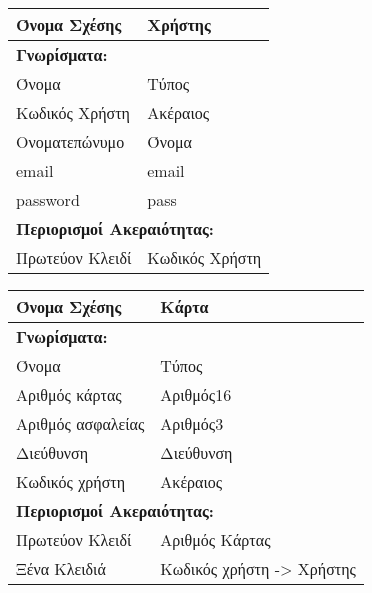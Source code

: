 \begin{tabular}{|p{6cm}|p{8cm}|}
  \hline
  Όνομα Σχέσης    & Χρήστης                                \\ \hline
  \multicolumn{2}{|l|}{\textbf{Γνωρίσματα:}}               \\ \hline
  Όνομα           & Τύπος                                  \\ \hline
  Κωδικός Χρήστη  & Ακέραιος                               \\ \hline
  Ονοματεπώνυμο   & Όνομα                                  \\ \hline
  email           & email                                  \\ \hline
  password        & pass                                   \\ \hline
  \multicolumn{2}{|l|}{\textbf{Περιορισμοί Ακεραιότητας:}} \\ \hline
  Πρωτεύον Κλειδί & Κωδικός Χρήστη                         \\ \hline
\end{tabular}


\begin{tabular}{|p{6cm}|p{8cm}|}
  \hline
  Όνομα Σχέσης      & Κάρτα                                \\ \hline
  \multicolumn{2}{|l|}{\textbf{Γνωρίσματα:}}               \\ \hline
  Όνομα             & Τύπος                                \\ \hline
  Αριθμός κάρτας    & Αριθμός16                            \\ \hline
  Αριθμός ασφαλείας & Αριθμός3                             \\ \hline
  Διεύθυνση         & Διεύθυνση                            \\ \hline
  Κωδικός χρήστη    & Ακέραιος                             \\ \hline
  \multicolumn{2}{|l|}{\textbf{Περιορισμοί Ακεραιότητας:}} \\ \hline
  Πρωτεύον Κλειδί   & Αριθμός Κάρτας                       \\ \hline
  Ξένα Κλειδιά      & Κωδικός χρήστη -> Χρήστης            \\ \hline
\end{tabular}

